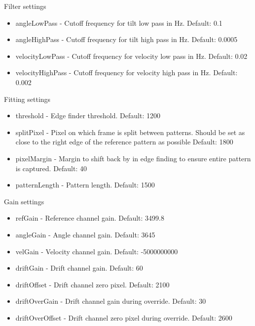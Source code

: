 \documentclass{article}
\begin{document}
Filter settings
\begin{itemize}
\item angleLowPass - Cutoff frequency for tilt low pass in Hz. Default: 0.1
\item angleHighPass - Cutoff frequency for tilt high pass in Hz. Default: 0.0005
\item velocityLowPass - Cutoff frequency for velocity low pass in Hz. Default: 0.02
\item velocityHighPass - Cutoff frequency for velocity high pass in Hz. Default: 0.002
\end{itemize}
Fitting settings
\begin{itemize}
\item threshold - Edge finder threshold. Default: 1200
\item splitPixel - Pixel on which frame is split between patterns. Should be set as close to the right edge of the reference pattern as possible Default: 1800
\item pixelMargin - Margin to shift back by in edge finding to ensure entire pattern is captured. Default: 40
\item patternLength - Pattern length. Default: 1500
\end{itemize}
Gain settings
\begin{itemize}
\item refGain - Reference channel gain. Default: 3499.8
\item angleGain - Angle channel gain. Default: 3645
\item velGain - Velocity channel gain. Default: -5000000000
\item driftGain - Drift channel gain. Default: 60
\item driftOffset - Drift channel zero pixel. Default: 2100
\item driftOverGain - Drift channel gain during override. Default: 30
\item driftOverOffset - Drift channel zero pixel during override. Default: 2600
\end{itemize}
\end{document}
